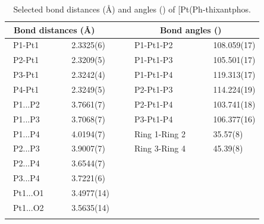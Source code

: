 \begin{table}[ht]
\caption[Selected bond distances (\AA) and angles (\degrees) of [Pt(Ph-thixantphos\ce{)2]}]{Selected bond distances (\AA) and angles (\degrees) of [Pt(Ph-thixantphos\ce{)2]}.}
\vspace{1em}
\label{table:crystalbisthixantphosplatinum:lengths}
\small
\begin{center}
\begin{tabular}{l l l l}
	\toprule
	\multicolumn{2}{l}{\bfseries{~Bond distances (\si{\angstrom})}} & \multicolumn{2}{c}{\bfseries{Bond angles (\degrees)}} \\
	\midrule		
	~P1-Pt1		~~&~~2.3325(6)~~	&~~P1-Pt1-P2		~~	&~~108.059(17)	\\
	~P2-Pt1		~~&~~2.3209(5)~~	&~~P1-Pt1-P3		~~	&~~105.501(17)	\\
	~P3-Pt1		~~&~~2.3242(4)~~	&~~P1-Pt1-P4		~~	&~~119.313(17)	\\
	~P4-Pt1		~~&~~2.3249(5)~~	&~~P2-Pt1-P3		~~	&~~114.224(19)	\\
	~P1...P2		~~&~~3.7661(7)~~	&~~P2-Pt1-P4		~~	&~~103.741(18)	\\
	~P1...P3		~~&~~3.7068(7)~~	&~~P3-Pt1-P4		~~	&~~106.377(16)	\\
	~P1...P4		~~&~~4.0194(7)~~	&~~Ring 1-Ring 2	~~	&~~35.57(8)		\\
	~P2...P3		~~&~~3.9007(7)~~	&~~Ring 3-Ring 4	~~	&~~45.39(8)		\\
	~P2...P4		~~&~~3.6544(7)~~	&~~				~~	&~~				\\
	~P3...P4		~~&~~3.7221(6)~~	&~~				~~	&~~				\\
	~Pt1...O1		~~&~~3.4977(14)~~	&~~				~~	&~~				\\
	~Pt1...O2		~~&~~3.5635(14)~~	&~~				~~	&~~				\\
	\bottomrule{}
\end{tabular}
\end{center}
\end{table}

